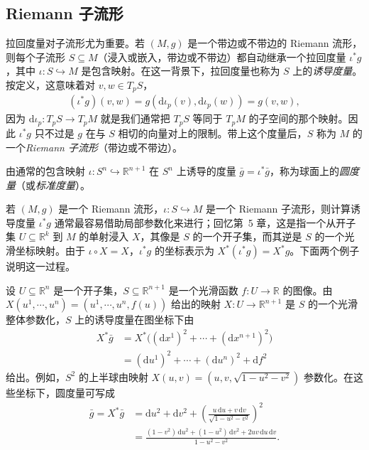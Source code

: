 \documentclass[../../main.tex]{subfiles}
\begin{document}
\subsection{Riemann 子流形}

拉回度量对子流形尤为重要。若 $(M,g)$ 是一个带边或不带边的 Riemann 流形，则每个子流形 $S\subseteq M$（浸入或嵌入，带边或不带边）都自动继承一个拉回度量 $\iota^*g$，其中 $\iota:S\hookrightarrow M$ 是包含映射。在这一背景下，拉回度量也称为 $S$ 上的\emph{诱导度量}。按定义，这意味着对 $v,w\in T_pS$，
\begin{align*}
(\iota^*g)(v,w)=g(\mathrm{d}\iota_p(v),\mathrm{d}\iota_p(w))=g(v,w),
\end{align*}
因为 $\mathrm{d}\iota_p:T_pS\to T_pM$ 就是我们通常把 $T_pS$ 等同于 $T_pM$ 的子空间的那个映射。因此 $\iota^*g$ 只不过是 $g$ 在与 $S$ 相切的向量对上的限制。带上这个度量后，$S$ 称为 $M$ 的一个\emph{Riemann 子流形}（带边或不带边）。

\begin{example}\label{example:ch13-round-metric}
由通常的包含映射 $\iota:S^n\hookrightarrow\mathbb{R}^{n+1}$ 在 $S^n$ 上诱导的度量 $\bar g=\iota^*\bar g$，称为球面上的\emph{圆度量}（或\emph{标准度量}）。
\end{example}

若 $(M,g)$ 是一个 Riemann 流形，$\iota:S\hookrightarrow M$ 是一个 Riemann 子流形，则计算诱导度量 $\iota^*g$ 通常最容易借助局部参数化来进行；回忆第~5 章，这是指一个从开子集 $U\subseteq\mathbb{R}^k$ 到 $M$ 的单射浸入 $X$，其像是 $S$ 的一个开子集，而其逆是 $S$ 的一个光滑坐标映射。由于 $\iota\circ X=X$，$\iota^*g$ 的坐标表示为 $X^*(\iota^*g)=X^*g$。下面两个例子说明这一过程。

\begin{example}[图坐标中的诱导度量]\label{example:ch13-graph-coords}
设 $U\subseteq\mathbb{R}^n$ 是一个开子集，$S\subseteq\mathbb{R}^{n+1}$ 是一个光滑函数 $f:U\to\mathbb{R}$ 的图像。由 $X(u^1,\cdots ,u^n)=(u^1,\cdots ,u^n,f(u))$ 给出的映射 $X:U\to\mathbb{R}^{n+1}$ 是 $S$ 的一个光滑整体参数化，$S$ 上的诱导度量在图坐标下由
\begin{align*}
X^*\bar g&=X^*\bigl((\mathrm{d}x^1)^2+\cdots+(\mathrm{d}x^{n+1})^2\bigr)\\
&=(\mathrm{d}u^1)^2+\cdots+(\mathrm{d}u^n)^2+\mathrm{d}f^2
\end{align*}
给出。例如，$S^2$ 的上半球由映射 $X(u,v)=(u,v,\sqrt{1-u^2-v^2})$ 参数化。在这些坐标下，圆度量可写成
\begin{align*}
\bar g=X^*\bar g&=\mathrm{d}u^2+\mathrm{d}v^2+\left(\frac{u\,\mathrm{d}u+v\,\mathrm{d}v}{\sqrt{1-u^2-v^2}}\right)^2\\
&=\frac{(1-v^2)\,\mathrm{d}u^2+(1-u^2)\,\mathrm{d}v^2+2uv\,\mathrm{d}u\,\mathrm{d}v}{1-u^2-v^2}.
\end{align*}
\end{example}
\end{document}
